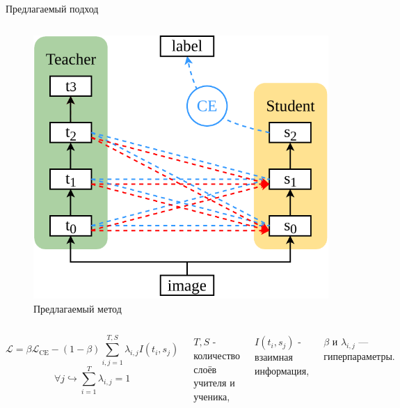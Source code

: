 \documentclass{beamer}
\begin{document}
\begin{frame}{Предлагаемый подход}
\begin{columns}[c]
        \begin{figure}
            \includegraphics[width=1.0\textwidth]{our_diagram.pdf}
            \caption{Предлагаемый метод}
        \end{figure}
    \end{columns}

    \begin{columns}[c]
        \begin{equation}
            \mathcal{L} = \beta \mathcal{L}_\text{CE} - (1 - \beta){\sum_{i, j=1}^{T, S}\lambda_{i, j}I(t_{i}, s_{j})}
        \end{equation}
        \vspace*{-\baselineskip}\setlength\belowdisplayshortskip{0pt}
        \begin{equation}
            \forall j \hookrightarrow  \sum_{i=1}^{T}\lambda_{i, j} = 1
        \end{equation}

        $T, S$ - количество слоёв учителя и ученика,

        $I(t_{i}, s_{j})$ - взаимная информация,

        $\beta$ и $\lambda_{i, j}$ --- гиперпараметры.
    \end{columns}

\end{frame}
\end{document}
